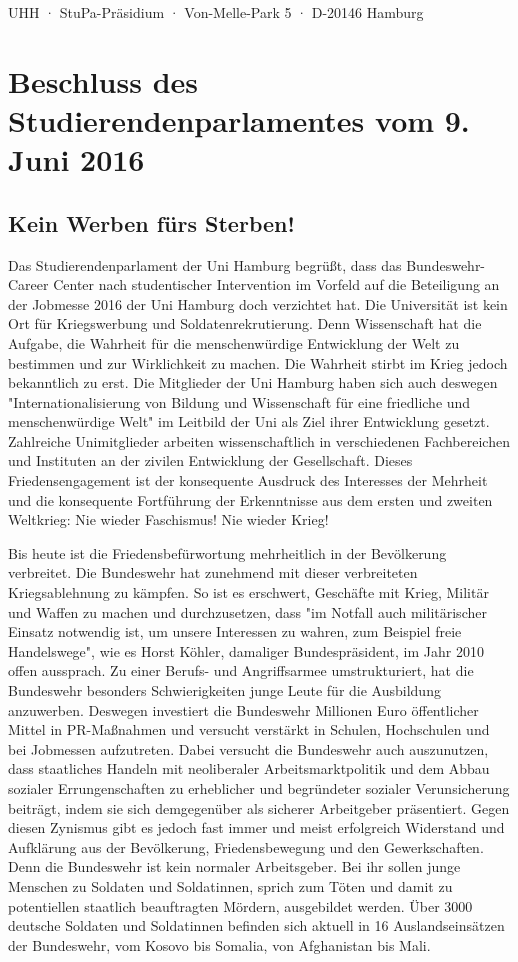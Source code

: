 \documentclass[ngerman,headheight=70pt]{scrartcl}
\begin{document}
    UHH · StuPa-Präsidium · Von-Melle-Park 5 · D-20146 Hamburg

    \section*{Beschluss des Studierendenparlamentes vom 9. Juni 2016}
    \subsection*{Kein Werben fürs Sterben!}

    Das Studierendenparlament der Uni Hamburg begrüßt, dass das
    Bundeswehr-Career Center nach studentischer Intervention im Vorfeld auf die
    Beteiligung an der Jobmesse 2016 der Uni Hamburg doch verzichtet hat. Die
    Universität ist kein Ort für Kriegswerbung und Soldatenrekrutierung. Denn
    Wissenschaft hat die Aufgabe, die Wahrheit für die menschenwürdige Entwicklung
    der Welt zu bestimmen und zur Wirklichkeit zu machen. Die Wahrheit stirbt im
    Krieg jedoch bekanntlich zu erst. Die Mitglieder der Uni Hamburg haben sich
    auch deswegen "Internationalisierung von Bildung und Wissenschaft für eine
    friedliche und menschenwürdige Welt" im Leitbild der Uni als Ziel ihrer
    Entwicklung gesetzt. Zahlreiche Unimitglieder arbeiten wissenschaftlich in
    verschiedenen Fachbereichen und Instituten an der zivilen Entwicklung der
    Gesellschaft. Dieses Friedensengagement ist der konsequente Ausdruck des
    Interesses der Mehrheit und die konsequente Fortführung der Erkenntnisse aus
    dem ersten und zweiten Weltkrieg: Nie wieder Faschismus! Nie wieder Krieg!

    Bis heute ist die Friedensbefürwortung mehrheitlich in der Bevölkerung
    verbreitet. Die Bundeswehr hat zunehmend mit dieser verbreiteten
    Kriegsablehnung zu kämpfen. So ist es erschwert, Geschäfte mit Krieg, Militär
    und Waffen zu machen und durchzusetzen, dass "im Notfall auch militärischer
    Einsatz notwendig ist, um unsere Interessen zu wahren, zum Beispiel freie
    Handelswege", wie es Horst Köhler, damaliger Bundespräsident, im Jahr 2010
    offen aussprach. Zu einer Berufs- und Angriffsarmee umstrukturiert, hat die
    Bundeswehr besonders Schwierigkeiten junge Leute für die Ausbildung anzuwerben.
    Deswegen investiert die Bundeswehr Millionen Euro öffentlicher Mittel in
    PR-Maßnahmen und versucht verstärkt in Schulen, Hochschulen und bei Jobmessen
    aufzutreten. Dabei versucht die Bundeswehr auch auszunutzen, dass staatliches
    Handeln mit neoliberaler Arbeitsmarktpolitik und dem Abbau sozialer
    Errungenschaften zu erheblicher und begründeter sozialer Verunsicherung
    beiträgt, indem sie sich demgegenüber als sicherer Arbeitgeber präsentiert.
    Gegen diesen Zynismus gibt es jedoch fast immer und meist erfolgreich
    Widerstand und Aufklärung aus der Bevölkerung, Friedensbewegung und den
    Gewerkschaften. Denn die Bundeswehr ist kein normaler Arbeitsgeber. Bei ihr
    sollen junge Menschen zu Soldaten und Soldatinnen, sprich zum Töten und damit
    zu potentiellen staatlich beauftragten Mördern, ausgebildet werden. Über 3000
    deutsche Soldaten und Soldatinnen befinden sich aktuell in 16 Auslandseinsätzen
    der Bundeswehr, vom Kosovo bis Somalia, von Afghanistan bis Mali.
\end{document}
